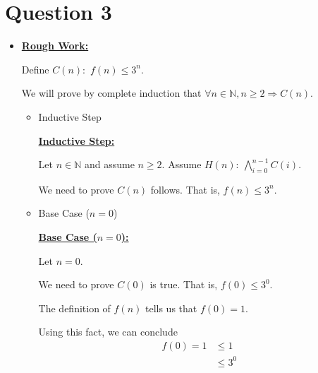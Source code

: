 \documentclass[12pt]{article}
\begin{document}
\section*{Question 3}
\begin{itemize}
    \item

    \begin{mdframed}
        \underline{\textbf{Rough Work:}}

        \bigskip

        Define $C(n):$ $f(n) \leq 3^n$.

        \bigskip

        We will prove by complete induction that $\forall n \in \mathbb{N}, n \geq 2 \Rightarrow C(n)$.

        \bigskip

        \begin{itemize}
            \item Inductive Step

            \begin{mdframed}
            \underline{\textbf{Inductive Step:}}

            \bigskip

            Let $n \in \mathbb{N}$ and assume $n \geq 2$. Assume $H(n):\:\bigwedge\limits_{i=0}^{n-1} C(i)$.

            \bigskip

            We need to prove $C(n)$ follows. That is, $f(n) \leq 3^n$.
            \end{mdframed}

            \item Base Case ($n = 0$)

            \begin{mdframed}
            \underline{\textbf{Base Case ($n = 0$):}}

            \bigskip

            Let $n = 0$.

            \bigskip

            We need to prove $C(0)$ is true. That is, $f(0) \leq 3^0$.

            \bigskip

            The definition of $f(n)$ tells us that $f(0) = 1$.

            \bigskip

            Using this fact, we can conclude
            \setcounter{equation}{0}
            \begin{align}
                f(0) = 1 &\leq 1\\
                &\leq 3^0
            \end{align}
            \end{mdframed}


\end{itemize}
\end{mdframed}
\end{itemize}
\end{document}
